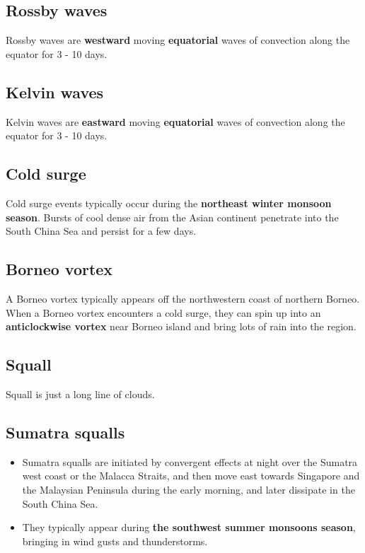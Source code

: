 \documentclass[11pt]{article}
\begin{document}
\subsection{Rossby waves}
\label{sec:org96770ca}
Rossby waves are \textbf{westward} moving \textbf{equatorial} waves of convection along the equator for 3 - 10 days.

\subsection{Kelvin waves}
\label{sec:orgf165381}
Kelvin waves are \textbf{eastward} moving \textbf{equatorial} waves of convection along the equator for 3 - 10 days.

\subsection{Cold surge}
\label{sec:org773d814}
Cold surge events typically occur during the \textbf{northeast winter monsoon season}. Bursts of cool dense air from the Asian continent penetrate into the South China Sea and persist for a few days.

\subsection{Borneo vortex}
\label{sec:org49619af}
A Borneo vortex typically appears off the northwestern coast of northern Borneo. When a Borneo vortex encounters a cold surge, they can spin up into an \textbf{anticlockwise vortex} near Borneo island and bring lots of rain into the region.

\newpage

\subsection{Squall}
\label{sec:orgc6f466a}
Squall is just a long line of clouds.

\subsection{Sumatra squalls}
\label{sec:org6a98865}
\begin{itemize}
\item Sumatra squalls are initiated by convergent effects at night over the Sumatra west coast or the Malacca Straits, and then move east towards Singapore and the Malaysian Peninsula during the early morning, and later dissipate in the South China Sea.
\item They typically appear during \textbf{the southwest summer monsoons season}, bringing in wind gusts and thunderstorms.
\end{itemize}
\end{document}

